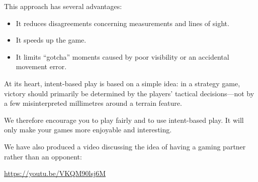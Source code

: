 This approach has several advantages:

\begin{itemize}
    \item It reduces disagreements concerning measurements and lines of sight.
    \item It speeds up the game.
    \item It limits ``gotcha'' moments caused by poor visibility or an accidental movement error.
\end{itemize}

At its heart, intent-based play is based on a simple idea: in a strategy game, victory should primarily be determined by the players' tactical decisions---not by a few misinterpreted millimetres around a terrain feature.

We therefore encourage you to play fairly and to use intent-based play. It will only make your games more enjoyable and interesting.

We have also produced a video discussing the idea of having a gaming partner rather than an opponent:

\begin{center}
    \url{https://youtu.be/VKQM90lsj6M}
\end{center}